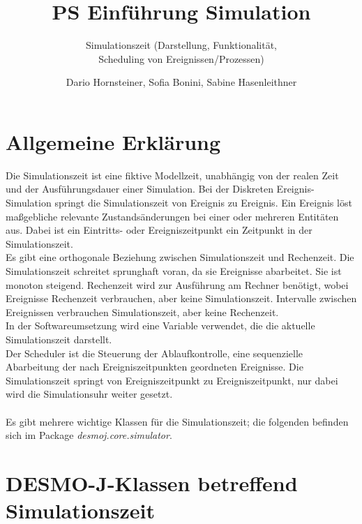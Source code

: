 \documentclass[runningheads]{llncs}
\begin{document}
\title{PS Einführung Simulation}
\subtitle{Simulationszeit (Darstellung, Funktionalität, \\ Scheduling von Ereignissen/Prozessen)}
\author{Dario Hornsteiner, Sofia Bonini, Sabine Hasenleithner}
\maketitle

\section{Allgemeine Erklärung}
Die Simulationszeit ist eine fiktive Modellzeit, unabhängig von der realen Zeit und der Ausführungsdauer einer Simulation. Bei der Diskreten Ereignis-Simulation springt die Simulationszeit von Ereignis zu Ereignis. Ein Ereignis löst maßgebliche relevante Zustandsänderungen bei einer oder mehreren Entitäten aus. Dabei ist ein Eintritts- oder Ereigniszeitpunkt ein Zeitpunkt in der Simulationszeit.\\
Es gibt eine orthogonale Beziehung zwischen Simulationszeit und Rechenzeit. Die Simulationszeit schreitet sprunghaft voran, da sie Ereignisse abarbeitet. Sie ist monoton steigend. Rechenzeit wird zur Ausführung am Rechner benötigt, wobei Ereignisse Rechenzeit verbrauchen, aber keine Simulationszeit. Intervalle zwischen Ereignissen verbrauchen Simulationszeit, aber keine Rechenzeit.\\
In der Softwareumsetzung wird eine Variable verwendet, die die  aktuelle Simulationszeit darstellt. \\
Der Scheduler ist die Steuerung der Ablaufkontrolle, eine sequenzielle Abarbeitung
der nach Ereigniszeitpunkten geordneten Ereignisse. Die Simulationszeit springt von Ereigniszeitpunkt zu Ereigniszeitpunkt, nur dabei wird die Simulationsuhr weiter gesetzt.\\
 \\
Es gibt mehrere wichtige Klassen für die Simulationszeit; die folgenden befinden sich im Package \textit{desmoj.core.simulator}.\\

\section{DESMO-J-Klassen betreffend Simulationszeit}
\end{document}
